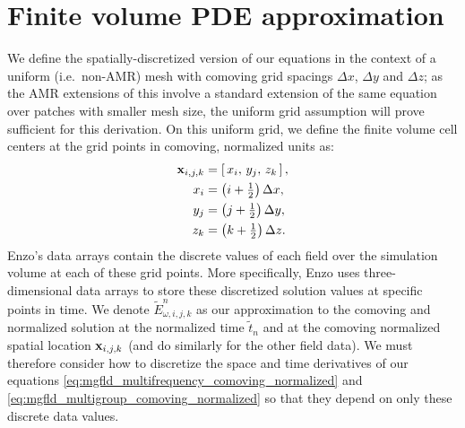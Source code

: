 \documentclass[10pt]{article}
\renewcommand{\(}{\left(}
\renewcommand{\)}{\right)}
\newcommand{\xvec}{{\bf x}}
\newcommand{\tT}{\tilde{t}}
\newcommand{\tE}{\tilde{E}}
\begin{document}
\section{Finite volume PDE approximation}
\label{sec:fv_approximation}

We define the spatially-discretized version of our equations in the
context of a uniform (i.e.~non-AMR) mesh with comoving grid spacings $\Delta x$,
$\Delta y$ and $\Delta z$; as the AMR extensions of this involve a
standard extension of the same equation over patches with smaller mesh
size, the uniform grid assumption will prove sufficient for this
derivation.  On this uniform grid, we define the finite volume cell
centers at the grid points in comoving, normalized units as: 
\begin{align*}
   \xvec_{i,j,k} &= \left[\,x_i,\,  y_j,\, z_k\,\right], \\
   x_i &= \left(i + \tfrac12\right) \Delta x, \\
   y_j &= \left(j + \tfrac12\right) \Delta y, \\
   z_k &= \left(k + \tfrac12\right) \Delta z.
\end{align*}
Enzo's data arrays contain the discrete values of each field over the
simulation volume at each of these grid points.  More specifically,
Enzo uses three-dimensional data arrays to store these discretized
solution values at specific points in time.  We denote $\tE^n_{\omega,i,j,k}$
as our approximation to the comoving and normalized solution at the
normalized time $\tT_{n}$ and at the comoving normalized spatial
location $\xvec_{i,j,k}$ (and do similarly for the other field data).
We must therefore consider how to discretize the space and time
derivatives of our equations
\eqref{eq:mgfld_multifrequency_comoving_normalized} and 
\eqref{eq:mgfld_multigroup_comoving_normalized}
so that they depend on only these discrete data values.
\end{document}

